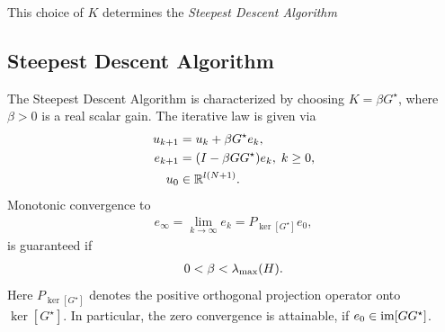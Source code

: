 This choice of $K$ determines the \textit{Steepest Descent Algorithm}

\subsection{Steepest Descent Algorithm}
\begin{alg}
	\label{alg: SDA}
	The Steepest Descent Algorithm is characterized by choosing $K = \beta G^\star$, where $\beta>0$ is a real scalar gain. The iterative law is given via 
	\begin{align}
	\label{eq:errSDA}
	\begin{split}
	u_{k+1} &= u_k + \beta G^\star e_k,\\
	e_{k+1} &= (I- \beta G G^\star) e_{k}, \; k\geq 0,\\
	u_0 &\in {\mathbb{R}}^{l (N+1)}. 
	\end{split}
	\end{align}
	Monotonic convergence to 
	\begin{align}
	\label{eq:SDAErrLim} 
	e_\infty  = \lim_{k\to\infty} e_k = P_{\ker[G^\star]}e_0,
	\end{align} 
	is guaranteed if
	\begin{align*}
	0 <\beta < \lambda_{\mathrm{max}}(H).
	\end{align*}
	Here $P_{\ker[G^\star]}$ denotes the positive orthogonal projection operator onto $\ker[G^\star]$.
	In particular, the zero convergence is attainable, if $e_0 \in \operatorname{im} [G G^\star]$. 
\end{alg} 
